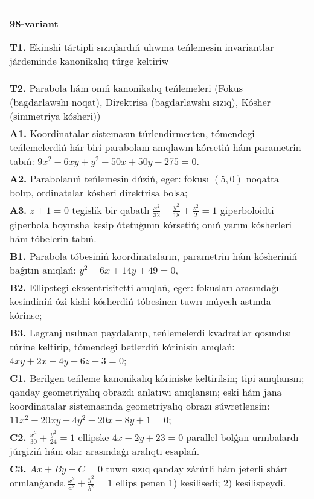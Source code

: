\documentclass{article}
\begin{document}
\begin{tabular}{m{17cm}}
\textbf{98-variant}
\newline

\textbf{T1.} Ekinshi tártipli sızıqlardıń ulıwma teńlemesin invariantlar járdeminde kanonikalıq túrge keltiriw \\
\textbf{T2.} Parabola hám onıń kanonikalıq teńlemeleri (Fokus (bagdarlawshı noqat), Direktrisa (bagdarlawshı sızıq), Kósher (simmetriya kósheri)) \\
\textbf{A1.} Koordinatalar sistemasın túrlendirmesten, tómendegi teńlemelerdiń hár biri parabolanı anıqlawın kórsetiń hám parametrin tabıń: $9 x^2-6 x y+y^2-50 x+50 y-275=0$. \\
\textbf{A2.} Parabolanıń teńlemesin dúziń, eger: fokusı $ (5,0) $ noqatta bolıp, ordinatalar kósheri direktrisa bolsa; \\
\textbf{A3.} $z+1=0$ tegislik bir qabatlı $\frac{x^2}{32}-\frac{y^2}{18}+\frac{z^2}{2}=1$ giperboloidti giperbola boyınsha kesip ótetuģının kórsetiń; onıń yarım kósherleri hám tóbelerin tabıń. \\
\textbf{B1.} Parabola tóbesiniń koordinataların, parametrin hám kósheriniń baǵıtın anıqlań: $y^2-6 x+14 y+49=0$, \\
\textbf{B2.} Ellipstegi ekssentrisitetti anıqlań, eger: fokusları arasındaǵı kesindiniń ózi kishi kósherdiń tóbesinen tuwrı múyesh astında kórinse; \\
\textbf{B3.} Lagranj usılınan paydalanıp, teńlemelerdi kvadratlar qosındısı túrine keltirip, tómendegi betlerdiń kórinisin anıqlań: $4 x y+2 x+4 y-6 z-3=0$; \\
\textbf{C1.} Berilgen teńleme kanonikalıq kóriniske keltirilsin; tipi anıqlansın; qanday geometriyalıq obrazdı anlatıwı anıqlansın; eski hám jana koordinatalar sistemasında geometriyalıq obrazı súwretlensin: $11 x^2-20 x y-4 y^2-20 x-8 y+1=0$; \\
\textbf{C2.} $\frac{x^2}{30}+\frac{y^2}{24}=1$ ellipske $4x-2y+23=0$ parallel bolǵan urınbalardı júrgiziń hám olar arasındaģı aralıqtı esaplań. \\
\textbf{C3.} $A x+B y+C=0$ tuwrı sızıq qanday zárúrli hám jeterli shárt orınlanǵanda $\frac{x^2}{a^2}+\frac{y^2}{b^2}=1$ ellips penen 1) kesilisedi; 2) kesilispeydi. \\

\end{tabular}
\vspace{1cm}
\end{document}
